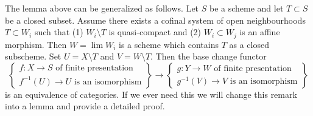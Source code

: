\begin{remark}
\label{remark-more-general-modification}
The lemma above can be generalized as follows. Let $S$ be a scheme and
let $T \subset S$ be a closed subset. Assume there exists a cofinal
system of open neighbourhoods $T \subset W_i$ such that
(1) $W_i \setminus T$ is quasi-compact and
(2) $W_i \subset W_j$ is an affine morphism.
Then $W = \lim W_i$ is a scheme which contains $T$
as a closed subscheme. Set $U = X \setminus T$ and $V = W \setminus T$.
Then the base change functor
$$
\left\{
\begin{matrix}
f : X \to S\text{ of finite presentation} \\
f^{-1}(U) \to U\text{ is an isomorphism}
\end{matrix}
\right\}
\longrightarrow
\left\{
\begin{matrix}
g : Y \to W\text{ of finite presentation} \\
g^{-1}(V) \to V\text{ is an isomorphism}
\end{matrix}
\right\}
$$
is an equivalence of categories. If we ever need this we will
change this remark into a lemma and provide a detailed proof.
\end{remark}












